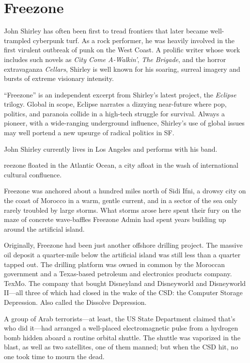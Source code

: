 \chapter{Freezone}

John Shirley has often been first to tread frontiers that later became well-trampled cyberpunk turf. As a rock performer, he was heavily involved in the first virulent outbreak of punk on the West Coast. A prolific writer whose work includes such novels as \textit{City Come A-Walkin'}, \textit{The Brigade}, and the horror extravaganza \textit{Cellars}, Shirley is well known for his soaring, surreal imagery and bursts of extreme visionary intensity.

``Freezone'' is an independent excerpt from Shirley's latest project, the \textit{Eclipse} trilogy. Global in scope, Eclipse narrates a dizzying near-future where pop, politics, and paranoia collide in a high-tech struggle for survival. Always a pioneer, with a wide-ranging underground influence, Shirley's use of global issues may well portend a new upsurge of radical politics in SF.

John Shirley currently lives in Los Angeles and performs with his band.

\hrulefill

reezone floated in the Atlantic Ocean, a city afloat in the wash of international cultural confluence.

Freezone was anchored about a hundred miles north of Sidi Ifni, a drowsy city on the coast of Morocco in a warm, gentle current, and in a sector of the sea only rarely troubled by large storms. What storms arose here spent their fury on the maze of concrete wave-baffles Freezone Admin had spent years building up around the artificial island.

Originally, Freezone had been just another offshore drilling project. The massive oil deposit a quarter-mile below the artificial island was still less than a quarter tapped out. The drilling platform was owned in common by the Moroccan government and a Texas-based petroleum and electronics products company. TexMo. The company that bought Disneyland and Disneyworld and Disneyworld II---all three of which had closed in the wake of the CSD: the Computer Storage Depression. Also called the Dissolve Depression.

A group of Arab terrorists---at least, the US State Department claimed that's who did it---had arranged a well-placed electromagnetic pulse from a hydrogen bomb hidden aboard a routine orbital shuttle. The shuttle was vaporized in the blast, as well as two satellites, one of them manned; but when the CSD hit, no one took time to mourn the dead.

